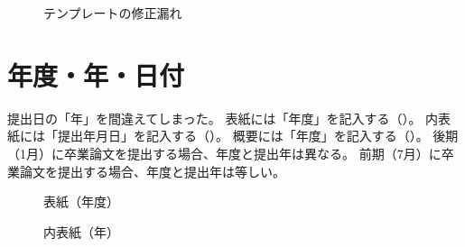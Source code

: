 \begin{figure}[H]
    \centering
    \caption{テンプレートの修正漏れ}
    \label{fig:fail-cover}
\end{figure}

\section{年度・年・日付}

提出日の「年」を間違えてしまった。
表紙には「年度」を記入する（）。
内表紙には「提出年月日」を記入する（）。
概要には「年度」を記入する（）。
後期（1月）に卒業論文を提出する場合、年度と提出年は異なる。
前期（7月）に卒業論文を提出する場合、年度と提出年は等しい。

\begin{figure}[htbp]
  \begin{minipage}[b]{0.5\linewidth}
    \centering
    \caption{表紙（年度）}
    \label{fig:fail-year01}
  \end{minipage}
  \begin{minipage}[b]{0.5\linewidth}
    \centering
    \caption{内表紙（年）}
    \label{fig:fail-year02}
  \end{minipage}
\end{figure}

